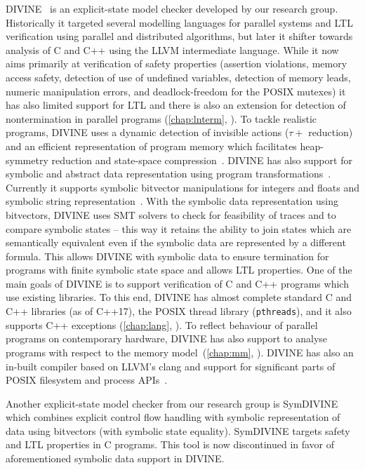 DIVINE~ is an explicit-state model checker developed
by our research group.
Historically it targeted several modelling languages for parallel systems and
LTL verification using parallel and distributed algorithms, but later it
shifter towards analysis of C and C++ using the LLVM intermediate language.
While it now aims primarily at verification of safety properties (assertion
violations, memory access safety, detection of use of undefined variables,
detection of memory leads, numeric manipulation errors, and deadlock-freedom for
the POSIX mutexes) it has also limited support for LTL and there is also an
extension for detection of nontermination in parallel programs
(\autoref{chap:lnterm}, ).
To tackle realistic programs, DIVINE uses a dynamic detection of invisible
actions ($\tau+$ reduction) and an efficient representation of program memory
which facilitates heap-symmetry reduction and state-space
compression~.
DIVINE has also support for symbolic and abstract data representation using
program transformations~.
Currently it supports symbolic bitvector manipulations for integers and floats
and symbolic string representation~.
With the symbolic data representation using bitvectors, DIVINE uses SMT solvers
to check for feasibility of traces and to compare symbolic states -- this way
it retains the ability to join states which are semantically equivalent even if
the symbolic data are represented by a different formula.
This allows DIVINE with symbolic data to ensure termination for programs with
finite symbolic state space and allows LTL properties.
One of the main goals of DIVINE is to support verification of C and C++
programs which use existing libraries.
To this end, DIVINE has almost complete standard C and C++ libraries (as of
C++17), the POSIX thread library (\texttt{pthreads}), and it also supports C++
exceptions (\autoref{chap:lang}, ).
To reflect behaviour of parallel programs on contemporary hardware, DIVINE
has also support to analyse programs with respect to the \xtso memory
model~(\autoref{chap:mm}, ).
DIVINE has also an in-built compiler based on LLVM's clang and support for
significant parts of POSIX filesystem and process APIs~.

Another explicit-state model checker from our research group is
\textsf{SymDIVINE}~ which combines explicit control flow
handling with symbolic representation of data using bitvectors (with symbolic
state equality).
\textsf{SymDIVINE} targets safety and LTL properties in C programs.
This tool is now discontinued in favor of aforementioned symbolic data support
in DIVINE.

